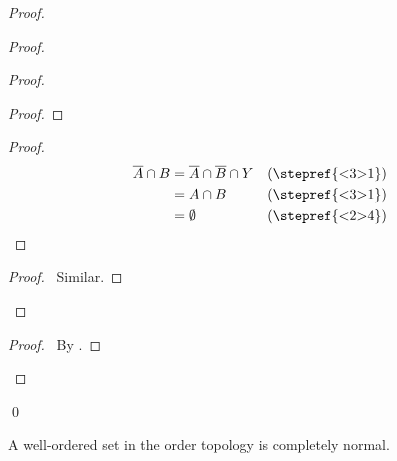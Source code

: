\begin{proof}
\begin{proof}
\begin{proof}
\begin{proof}
     \end{proof}
     \begin{proof}
       \begin{align*}
         \overline{A} \cap B & = \overline{A} \cap \overline{B} \cap Y &
         (\text{\stepref{<3>1}}) \\
         & = A \cap B & (\text{\stepref{<3>1}}) \\
         & = \emptyset & (\text{\stepref{<2>4}})
       \end{align*}
     \end{proof}
     \begin{proof}
       \pf\ Similar.
     \end{proof}
   \end{proof}
   \begin{proof}
     \pf\ By .
   \end{proof}
 \end{proof}
 \qed
\end{proof}

\begin{prop}
  \label{prop:topology:completely_normal:well_ordered}
 A well-ordered set in the order topology is completely normal.
\end{prop}

